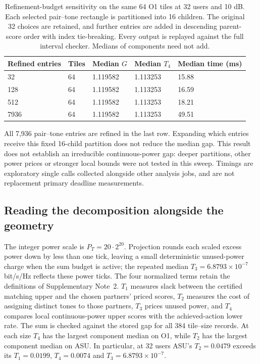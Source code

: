 \documentclass[10pt,letterpaper]{article}
\begin{document}
\begin{table}[htbp]\centering\small
\setlength{\tabcolsep}{4pt}
\caption{Refinement-budget sensitivity on the same 64 O1 tiles at 32 users and 10 dB. Each selected pair--tone rectangle is partitioned into 16 children. The original 32 choices are retained, and further entries are added in descending parent-score order with index tie-breaking. Every output is replayed against the full interval checker. Medians of components need not add.}\label{supp:refinement}
\begin{tabular}{lllll}\toprule
Refined entries & Tiles & Median $G$ & Median $T_4$ & Median time (ms)\\
\midrule
32 & 64 & 1.119582 & 1.113253 & 15.88\\
128 & 64 & 1.119582 & 1.113253 & 16.59\\
512 & 64 & 1.119582 & 1.113253 & 18.21\\
7936 & 64 & 1.119582 & 1.113253 & 49.51\\
\bottomrule\end{tabular}
\end{table}
All 7,936 pair--tone entries are refined in the last row. Expanding which entries receive this fixed 16-child partition does not reduce the median gap. This result does not establish an irreducible continuous-power gap: deeper partitions, other power prices or stronger local bounds were not tested in this sweep. Timings are exploratory single calls collected alongside other analysis jobs, and are not replacement primary deadline measurements.


\subsection*{Reading the decomposition alongside the geometry}
The integer power scale is \(P_T=20\cdot2^{20}\). Projection rounds each scaled excess power down by less than one tick, leaving a small deterministic unused-power charge when the sum budget is active; the repeated median \(T_3=6.8793\times10^{-7}\) bit/s/Hz reflects these power ticks. The four normalized terms retain the definitions of Supplementary Note~2. \(T_1\) measures slack between the certified matching upper and the chosen partners' priced scores, \(T_2\) measures the cost of assigning distinct tones to those partners, \(T_3\) prices unused power, and \(T_4\) compares local continuous-power upper scores with the achieved-action lower rate. The sum is checked against the stored gap for all 384 tile--size records. At each size \(T_4\) has the largest component median on O1, while \(T_2\) has the largest component median on ASU. In particular, at 32 users ASU's \(T_2=0.0479\) exceeds its \(T_1=0.0199\), \(T_4=0.0074\) and \(T_3=6.8793\times10^{-7}\).
\end{document}
